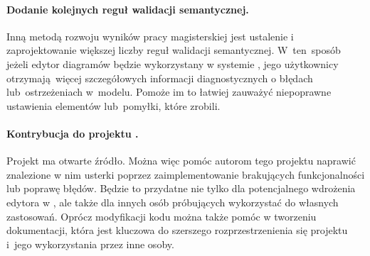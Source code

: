 \paragraph{Dodanie kolejnych reguł walidacji semantycznej.}
Inną metodą rozwoju wyników pracy magisterskiej jest ustalenie i
zaprojektowanie większej liczby reguł walidacji semantycznej. W~ten~sposób
jeżeli edytor diagramów będzie wykorzystany w systemie \BalticLSC{}, jego
użytkownicy otrzymają więcej szczegółowych informacji diagnostycznych o błędach
lub~ostrzeżeniach w~modelu. Pomoże im to łatwiej zauważyć niepoprawne
ustawienia elementów lub~pomyłki, które zrobili.

\paragraph{Kontrybucja do projektu \SiriusWeb{}.}
Projekt \SiriusWeb{} ma otwarte źródło. Można więc pomóc autorom tego
projektu naprawić znalezione w nim usterki poprzez zaimplementowanie
brakujących funkcjonalności lub poprawę błędów. Będzie to przydatne nie tylko
dla potencjalnego wdrożenia edytora w \BalticLSC{}, ale także dla innych
osób próbujących wykorzystać \SiriusWeb{} do własnych zastosowań.
Oprócz modyfikacji kodu można także pomóc w tworzeniu dokumentacji, która jest
kluczowa do szerszego rozprzestrzenienia się projektu i~jego wykorzystania
przez inne osoby.
